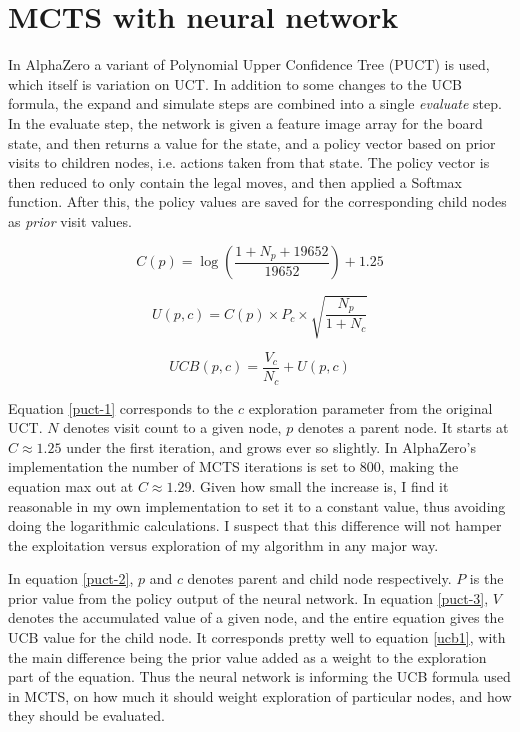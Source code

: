 \section{MCTS with neural network}
In AlphaZero a variant of Polynomial Upper Confidence Tree (PUCT) is used, which itself is variation on UCT. In addition to some changes to the UCB formula, the expand and simulate steps are combined into a single \textit{evaluate} step. In the evaluate step, the network is given a feature image array for the board state, and then returns a value for the state, and a policy vector based on prior visits to children nodes, i.e. actions taken from that state. The policy vector is then reduced to only contain the legal moves, and then applied a Softmax function. After this, the policy values are saved for the corresponding child nodes as \textit{prior} visit values.

\begin{equation}
C(p) = \log\left(\frac{1 + N_p + 19652}{19652}\right) + 1.25
\label{puct-1}
\end{equation}

\begin{equation}
U(p,c) = C(p)\times P_c\times \sqrt{\frac{N_p}{1 + N_c}}
\label{puct-2}
\end{equation}

\begin{equation}
UCB(p,c) = \frac{V_c}{N_c} + U(p,c)
\label{puct-3}
\end{equation}

Equation \ref{puct-1} corresponds to the $c$ exploration parameter from the original UCT. $N$ denotes visit count to a given node, $p$ denotes a parent node. It starts at $C \approx 1.25$ under the first iteration, and grows ever so slightly. In AlphaZero's implementation the number of MCTS iterations is set to 800, making the equation max out at $C \approx 1.29$\cite{Silver2018}. Given how small the increase is, I find it reasonable in my own implementation to set it to a constant value, thus avoiding doing the logarithmic calculations. I suspect that this difference will not hamper the exploitation versus exploration of my algorithm in any major way.

In equation \ref{puct-2}, $p$ and $c$ denotes parent and child node respectively. $P$ is the prior value from the policy output of the neural network. In equation \ref{puct-3}, $V$ denotes the accumulated value of a given node, and the entire equation gives the UCB value for the child node. It corresponds pretty well to equation \ref{ucb1}, with the main difference being the prior value added as a weight to the exploration part of the equation. Thus the neural network is informing the UCB formula used in MCTS, on how much it should weight exploration of particular nodes, and how they should be evaluated.

